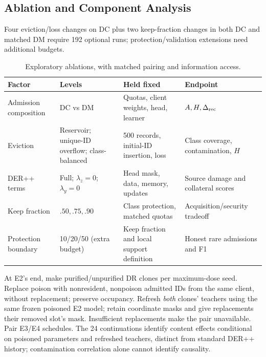 \documentclass[10pt,a4paper]{article}
\begin{document}
\subsection{Ablation and Component Analysis}
Four eviction/loss changes on DC plus two keep-fraction changes in both DC and matched DM require 192 optional runs; protection/validation extensions need additional budgets.
\begin{table}[htbp]
\centering\footnotesize
\caption{Exploratory ablations, with matched pairing and information access.}
\label{tab:ablations}
\begin{tabularx}{\linewidth}{L{2.1cm}Y Y Y}
\toprule
Factor & Levels & Held fixed & Endpoint\\
\midrule
Admission composition & DC vs DM & Quotas, client weights, head, learner & $A,H,\Delta_{\rm rec}$\\
Eviction & Reservoir; unique-ID overflow; class-balanced & 500 records, initial-ID insertion, loss & Class coverage, contamination, $H$\\
DER++ terms & Full; $\lambda_z=0$; $\lambda_y=0$ & Head mask, data, memory, updates & Source damage and collateral scores\\
Keep fraction & $.50,.75,.90$ & Class protection, matched quotas & Acquisition/security tradeoff\\
Protection boundary & 10/20/50 (extra budget) & Keep fraction and local support definition & Honest rare admissions and F1\\
\bottomrule
\end{tabularx}
\end{table}
At E2's end, make purified/unpurified DR clones per maximum-dose seed. Replace poison with nonresident, nonpoison admitted IDs from the same client, without replacement; preserve occupancy. Refresh \emph{both} clones' teachers using the same frozen poisoned E2 model; retain coordinate masks and give replacements their removed slot's mask. Insufficient replacements make the pair unavailable. Pair E3/E4 schedules. The 24 continuations identify content effects conditional on poisoned parameters and refreshed teachers, distinct from standard DER++ history; contamination correlation alone cannot identify causality.
\end{document}
